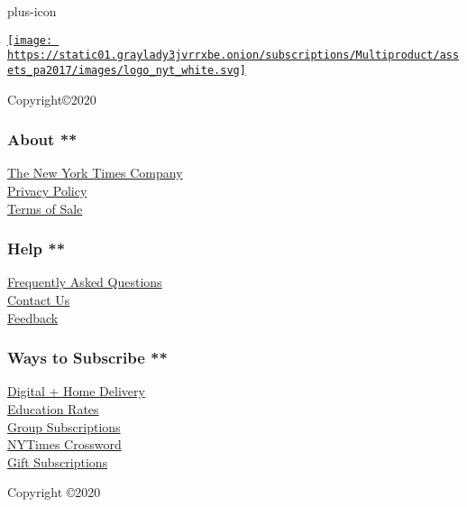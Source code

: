 plus-icon

\href{https://www.nytimes3xbfgragh.onion}{\texttt{[image: https://static01.graylady3jvrrxbe.onion/subscriptions/Multiproduct/assets\_pa2017/images/logo\_nyt\_white.svg]}}

Copyright©2020

\hypertarget{about-}{%
\subsubsection{About **}\label{about-}}

\href{http://www.nytco.com/}{The New York Times Company}\\
\href{https://www.nytimes3xbfgragh.onion/privacy}{Privacy Policy}\\
\href{https://www.nytimes3xbfgragh.onion/content/help/rights/sale/terms-of-sale.html}{Terms
of Sale}

\hypertarget{help-}{%
\subsubsection{Help **}\label{help-}}

\href{https://www.nytimes3xbfgragh.onion/content/help/account/purchases/subscriptions-and-purchases.html}{Frequently
Asked Questions}\\
\href{https://www.nytimes3xbfgragh.onion/content/help/contact/directory.html}{Contact
Us}\\
\href{https://myaccount.nytimes3xbfgragh.onion/membercenter/feedback.html}{Feedback}

\hypertarget{ways-to-subscribe-}{%
\subsubsection{Ways to Subscribe **}\label{ways-to-subscribe-}}

\href{https://www.nytimes3xbfgragh.onion/subscription/multiproduct/lp8HYKU.html?campaignId=6JUHR}{Digital
+ Home Delivery}\\
\href{https://www.nytimes3xbfgragh.onion/subscriptions/edu/lp8LQFK.html?campaignId=6RR8R}{Education
Rates}\\
\href{http://nytimesgroupsubscriptions.com/?Pardot_Campaign_Code_Form_Input=6RJUJ}{Group
Subscriptions}\\
\href{https://www.nytimes3xbfgragh.onion/subscriptions/games/lp897H9.html?campaignId=6RRWR}{NYTimes
Crossword}\\
\href{https://www.nytimes3xbfgragh.onion/subscription/gift?campaignId=3FQ4Y}{Gift
Subscriptions}

Copyright ©2020
